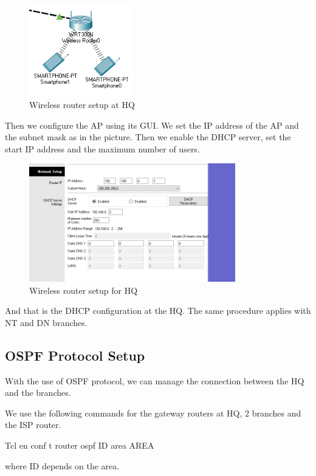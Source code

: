 \begin{figure}[H]
  \centering
  \includegraphics[width=0.4\textwidth]{./assets/ap1.png}
  \caption{Wireless router setup at HQ}
\end{figure}

Then we configure the AP using its GUI\@.
We set the IP address of the AP and the subnet mask as in the picture.
Then we enable the DHCP server, set the start IP address and the maximum number of users.

\begin{figure}[H]
  \centering
  \includegraphics[width=0.8\textwidth]{./assets/wifi1.png}
  \caption{Wireless router setup for HQ}
\end{figure}

And that is the DHCP configuration at the HQ\@.
The same procedure applies with NT and DN branches.

\subsection{OSPF Protocol Setup}
With the use of OSPF protocol, we can manage the connection between the HQ and the branches.

We use the following commands for the gateway routers at HQ, 2 branches and the ISP router.
\begin{code}{Tcl}
  en
  conf t
  router ospf ID
  area AREA
\end{code}
where ID depends on the area.


